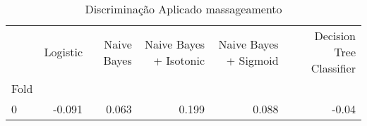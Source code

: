 \begin{table}
\centering
\caption{Discriminação Aplicado massageamento}
\label{Discriminação Aplicado massageamento 7}
\begin{tabular}{lrrrrr}
\toprule
{} &  Logistic &  Naive Bayes &  Naive Bayes + Isotonic &  Naive Bayes + Sigmoid &  Decision Tree Classifier \\
Fold &           &              &                         &                        &                           \\
\midrule
0    &    -0.091 &        0.063 &                   0.199 &                  0.088 &                     -0.04 \\
\bottomrule
\end{tabular}
\end{table}
